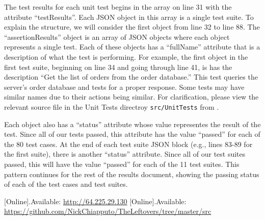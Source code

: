 \documentclass[11pt]{article}
\begin{document}
		The test results for each unit test begins in the array on line 31 with the attribute ``testResults''. Each JSON object in this array is a single test suite. To explain the structure, we will consider the first object from line 32 to line 88. The ``assertionResults'' object is an array of JSON objects where each object represents a single test. Each of these objects has a ``fullName'' attribute that is a description of what the test is performing. For example, the first object in the first test suite, beginning on line 34 and going through line 41, is has the description ``Get the list of orders from the order database.'' This test queries the server's order database and tests for a proper response. Some tests may have similar names due to their actions being similar. For clarification, please view the relevant source file in the Unit Tests directroy \texttt{src/UnitTests} from \cite{repository}.

		Each object also has a ``status'' attribute whose value representes the result of the test. Since all of our tests passed, this attribute has the value ``passed'' for each of the 80 test cases. At the end of each test suite JSON block (e.g., lines 83-89 for the first suite), there is another ``status'' attribute. Since all of our test suites passed, this will have the value ``passed'' for each of the 11 test suites. This pattern continues for the rest of the results document, showing the passing status of each of the test cases and test suites.

	\begin{thebibliography}{00}
		 [Online].Available: \url{http://64.225.29.130}
		 [Online].Available: \url{https://github.com/NickChiapputo/TheLeftovers/tree/master/src}
	\end{thebibliography}
\end{document}
